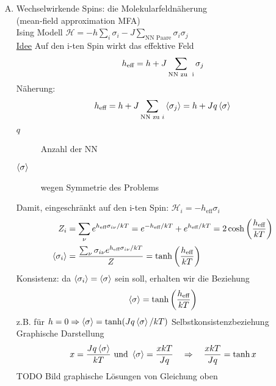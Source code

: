\begin{enumerate}[A)]
    \item Wechselwirkende Spins: die Molekularfeldnäherung \\
    (mean-field approximation MFA) \\
    Ising Modell $\mathscr{H} = - h \sum_i \sigma_i - J \sum_{\text{NN Paare}} \sigma_i \sigma_j$ \\
    \underline{Idee} Auf den i-ten Spin wirkt das effektive Feld
    \begin{equation}
        h_\text{eff} = h + J \sum_\text{\text{NN zu } i} \sigma_j
    \end{equation}
    Näherung:
    \begin{equation}
        h_\text{eff} = h + J \sum_{\text{NN zu } i} \left\langle\sigma_j\right\rangle = h + J q \left\langle\sigma\right\rangle
    \end{equation}
    \begin{description}
        \item[$q$] Anzahl der NN
        \item[$\left\langle\sigma\right\rangle$] wegen Symmetrie des Problems
    \end{description}
    Damit, eingeschränkt auf den i-ten Spin: $\mathscr{H}_i = - h_\text{eff} \sigma _i$
    \begin{equation}
        \begin{split}
            Z_i &= \sum_\nu e^{h_\text{eff} \sigma_{i \nu} / kT} = e^{-h_\text{eff} / kT} + e^{h_\text{eff} / k T} = 2 \cosh \left( \frac{h_\text{eff}}{kT} \right) \\
            \left\langle\sigma_i\right\rangle &= \frac{\sum_\nu \sigma_{i \nu} e^{h_\text{eff} \sigma_{i \nu} / k T}}{Z} = \tanh \left( \frac{h_\text{eff}}{k T} \right)
        \end{split}
    \end{equation}
    Konsistenz: da $\left\langle\sigma_i\right\rangle = \left\langle\sigma\right\rangle$ sein soll, erhalten wir die Beziehung
    \begin{equation}
        \left\langle\sigma\right\rangle = \tanh \left( \frac{h_\text{eff}}{k T} \right)
    \end{equation}
    z.B. für $h = 0 \Rightarrow \left\langle\sigma\right\rangle = \tanh (J q \left\langle\sigma\right\rangle / k T)$ Selbstkonsistenzbeziehung \\
    Graphische Darstellung
    \begin{equation}
        x = \frac{ J q \left\langle\sigma\right\rangle}{k T} \text{  und  } \left\langle\sigma\right\rangle = \frac{x k T}{J q} \quad \Rightarrow \quad \frac{x k T}{J q} = \tanh x
    \end{equation}
    TODO Bild graphische Lösungen von Gleichung oben\\ %

\end{enumerate}
